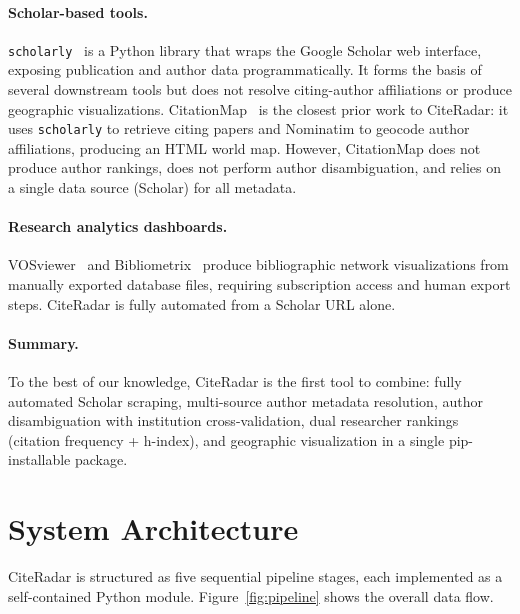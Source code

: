 \documentclass[11pt]{article}
\begin{document}
\paragraph{Scholar-based tools.}
\texttt{scholarly}~\cite{choubey2019scholarly} is a Python library that wraps
the Google Scholar web interface, exposing publication and author data
programmatically.
It forms the basis of several downstream tools but does not resolve
citing-author affiliations or produce geographic visualizations.
CitationMap~\cite{liu2024citationmap} is the closest prior work to CiteRadar:
it uses \texttt{scholarly} to retrieve citing papers and Nominatim to
geocode author affiliations, producing an HTML world map.
However, CitationMap does not produce author rankings, does not perform
author disambiguation, and relies on a single data source (Scholar) for
all metadata.

\paragraph{Research analytics dashboards.}
VOSviewer~\cite{vaneck2010vosviewer} and Bibliometrix~\cite{aria2017}
produce bibliographic network visualizations from manually exported database
files, requiring subscription access and human export steps.
CiteRadar is fully automated from a Scholar URL alone.

\paragraph{Summary.}
To the best of our knowledge, CiteRadar is the first tool to combine:
fully automated Scholar scraping, multi-source author metadata resolution,
author disambiguation with institution cross-validation, dual researcher
rankings (citation frequency + h-index), and geographic visualization
in a single pip-installable package.


\section{System Architecture}
\label{sec:arch}

CiteRadar is structured as five sequential pipeline stages, each implemented
as a self-contained Python module.
Figure~\ref{fig:pipeline} shows the overall data flow.
\end{document}
